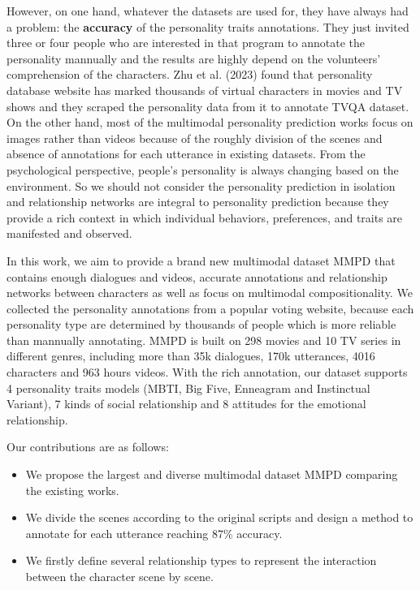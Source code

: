 \documentclass[11pt]{article}
\begin{document}
However, on one hand, whatever the datasets are used for, they have always had a problem: the \textbf{accuracy} of the personality traits annotations. They just invited three or four people who are interested in that program to annotate the personality mannually and the results are highly depend on the volunteers' comprehension of the characters. Zhu et al. (2023) found that personality database website has marked thousands of virtual characters in movies and TV shows and they scraped the personality data from it to annotate TVQA dataset. On the other hand, most of the multimodal personality prediction works focus on images rather than videos because of the roughly division of the scenes and absence of annotations for each utterance in existing datasets. From the psychological perspective, people's personality is always changing based on the environment. So we should not consider the personality prediction in isolation and relationship networks are integral to personality prediction because they provide a rich context in which individual behaviors, preferences, and traits are manifested and observed.

In this work, we aim to provide a brand new multimodal dataset MMPD that contains enough dialogues and videos, accurate annotations and relationship networks between characters as well as focus on multimodal compositionality. We collected the personality annotations from a popular voting website, because each personality type are determined by thousands of people which is more reliable than mannually annotating. MMPD is built on 298 movies and 10 TV series in different genres, including more than 35k dialogues, 170k utterances, 4016 characters and 963 hours videos. With the rich annotation, our dataset supports 4 personality traits models (MBTI, Big Five, Enneagram and Instinctual Variant), 7 kinds of social relationship and 8 attitudes for the emotional relationship.

Our contributions are as follows:

\begin{itemize}
  \item We propose the largest and diverse multimodal dataset MMPD comparing the existing works. 
  \item We divide the scenes according to the original scripts and design a method to annotate for each utterance reaching 87\% accuracy.
  \item We firstly define several relationship types to represent the interaction between the character scene by scene.
\end{itemize}
\end{document}
